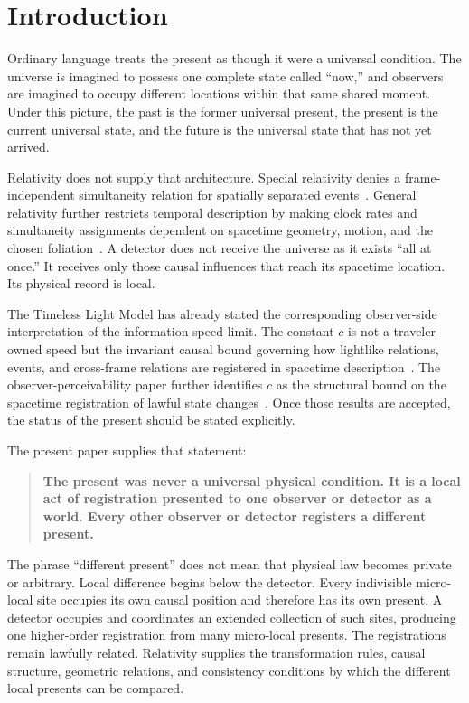 \documentclass[12pt,onecolumn]{article}
\begin{document}
\section{Introduction}

Ordinary language treats the present as though it were a universal condition. The universe is imagined to possess one complete state called ``now,'' and observers are imagined to occupy different locations within that same shared moment. Under this picture, the past is the former universal present, the present is the current universal state, and the future is the universal state that has not yet arrived.

Relativity does not supply that architecture. Special relativity denies a frame-independent simultaneity relation for spatially separated events~\cite{Einstein1905,Rindler2006}. General relativity further restricts temporal description by making clock rates and simultaneity assignments dependent on spacetime geometry, motion, and the chosen foliation~\cite{Wald1984,MTW1973}. A detector does not receive the universe as it exists ``all at once.'' It receives only those causal influences that reach its spacetime location. Its physical record is local.

The Timeless Light Model has already stated the corresponding observer-side interpretation of the information speed limit. The constant \(c\) is not a traveler-owned speed but the invariant causal bound governing how lightlike relations, events, and cross-frame relations are registered in spacetime description~\cite{RegistrationBound}. The observer-perceivability paper further identifies \(c\) as the structural bound on the spacetime registration of lawful state changes~\cite{ObserverPerceivability}. Once those results are accepted, the status of the present should be stated explicitly.

The present paper supplies that statement:

\begin{quote}
\textbf{The present was never a universal physical condition. It is a local act of registration presented to one observer or detector as a world. Every other observer or detector registers a different present.}
\end{quote}

The phrase ``different present'' does not mean that physical law becomes private or arbitrary. Local difference begins below the detector. Every indivisible micro-local site occupies its own causal position and therefore has its own present. A detector occupies and coordinates an extended collection of such sites, producing one higher-order registration from many micro-local presents. The registrations remain lawfully related. Relativity supplies the transformation rules, causal structure, geometric relations, and consistency conditions by which the different local presents can be compared.
\end{document}
